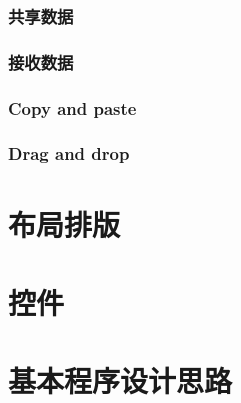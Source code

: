 \documentclass{book}
\begin{document}
	\subsection{共享数据}\label{subsection:sharedata}
	
	\subsection{接收数据}\label{subsection:receivedata}
	
	\subsection{Copy and paste}\label{subsection:copyandpaste}
	
	\subsection{Drag and drop}\label{subsection:draganddrop}
	
	\chapter{布局排版}
	
	\chapter{控件}
	
	\chapter{基本程序设计思路}
	
	
	
\end{document}
